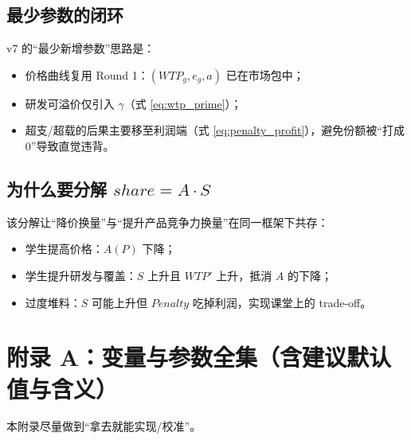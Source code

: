 \documentclass[UTF8,12pt]{ctexart}
\begin{document}
\subsection{最少参数的闭环}
v7 的“最少新增参数”思路是：
\begin{itemize}
  \item 价格曲线复用 Round 1：$(WTP_g,e_g,a)$ 已在市场包中；
  \item 研发可溢价仅引入 $\gamma$（式 \eqref{eq:wtp_prime}）；
  \item 超支/超载的后果主要移至利润端（式 \eqref{eq:penalty_profit}），避免份额被“打成 0”导致直觉违背。
\end{itemize}

\subsection{为什么要分解 $share=A\cdot S$}
该分解让“降价换量”与“提升产品竞争力换量”在同一框架下共存：
\begin{itemize}
  \item 学生提高价格：$A(P)$ 下降；
  \item 学生提升研发与覆盖：$S$ 上升且 $WTP'$ 上升，抵消 $A$ 的下降；
  \item 过度堆料：$S$ 可能上升但 $Penalty$ 吃掉利润，实现课堂上的 trade-off。
\end{itemize}

\appendix
\clearpage
\section{附录 A：变量与参数全集（含建议默认值与含义）}
本附录尽量做到“拿去就能实现/校准”。
\end{document}
